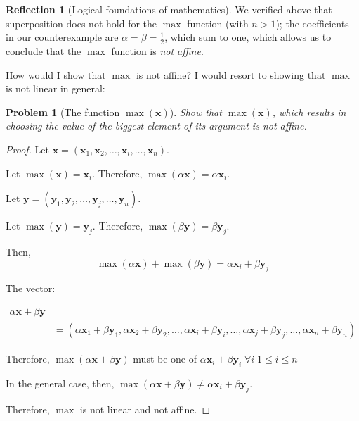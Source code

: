 \documentclass[11pt]{book}
\theoremstyle{definition}
\theoremstyle{plain}
\theoremstyle{problemstyle}
\newtheorem{problem}{Problem}
\theoremstyle{remark}
\theoremstyle{definition}
\newtheorem{reflection}{Reflection}
\begin{document}
\begin{reflection}[Logical foundations of mathematics]
    We verified above that superposition does not hold for the $\max$ function (with $n>1$); the coefficients in our counterexample are $\alpha=\beta=\frac{1}{2}$, which sum to one, which allows us to conclude that the $\max$ function is \emph{not affine}.

    How would I show that $\max$ is not affine? I would resort to showing that $\max$ is not linear in general:
    \begin{problem}[The function $\max(\boldsymbol{x})$]
        \label{pr:max-func-not-affine}
        Show that $\max(\boldsymbol{x})$, which results in choosing the value of the biggest element of its argument is not affine.
    \end{problem}
    \begin{proof}
        Let $\boldsymbol{x}=(\boldsymbol{x}_1,\boldsymbol{x}_2,\dots,\boldsymbol{x}_i,\dots,\boldsymbol{x}_n)$.

        Let $\max(\boldsymbol{x})=\boldsymbol{x}_i$. Therefore, $\max(\alpha\boldsymbol{x})=\alpha\boldsymbol{x}_i$.

        Let $\boldsymbol{y}=(\boldsymbol{y}_1,\boldsymbol{y}_2,\dots,\boldsymbol{y}_j,\dots,\boldsymbol{y}_n)$.

        Let $\max(\boldsymbol{y})=\boldsymbol{y}_j$. Therefore, $\max(\beta\boldsymbol{y})=\beta\boldsymbol{y}_j$.

        Then,
        \begin{equation}
            \label{eq:max-func-not-affine-1}
            \max(\alpha\boldsymbol{x})+\max(\beta\boldsymbol{y})=\alpha\boldsymbol{x}_i+\beta\boldsymbol{y}_j
        \end{equation}

        The vector: 

        \begin{equation}
            \label{eq:max-func-not-affine-2}
            \begin{aligned}
                \alpha\boldsymbol{x}+\beta\boldsymbol{y}\\
                &=(\alpha\boldsymbol{x}_1+\beta\boldsymbol{y}_1,\alpha\boldsymbol{x}_2+\beta\boldsymbol{y}_2,\dots,\alpha\boldsymbol{x}_i+\beta\boldsymbol{y}_i,\dots,\alpha\boldsymbol{x}_j+\beta\boldsymbol{y}_j,\dots,\alpha\boldsymbol{x}_n+\beta\boldsymbol{y}_n)
            \end{aligned}
        \end{equation}

        Therefore, $\max(\alpha\boldsymbol{x}+\beta\boldsymbol{y})$ must be one of $\alpha\boldsymbol{x}_i+\beta\boldsymbol{y}_i\;\forall i\;1\leq i\leq n$

        In the general case, then, $\max(\alpha\boldsymbol{x}+\beta\boldsymbol{y})\ne\alpha\boldsymbol{x}_i+\beta\boldsymbol{y}_j$.

        Therefore, $\max$ is not linear and not affine.

    \end{proof}


\end{reflection}
\end{document}

